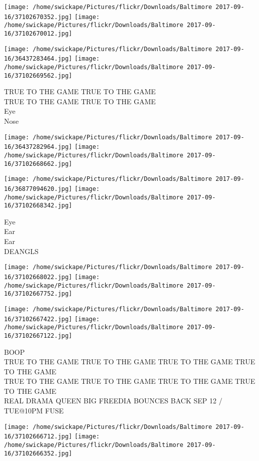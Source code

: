 \documentclass[10pt,letterpaper]{article}
\begin{document}
\texttt{[image: /home/swickape/Pictures/flickr/Downloads/Baltimore 2017-09-16/37102670352.jpg]}
\texttt{[image: /home/swickape/Pictures/flickr/Downloads/Baltimore 2017-09-16/37102670012.jpg]}

\texttt{[image: /home/swickape/Pictures/flickr/Downloads/Baltimore 2017-09-16/36437283464.jpg]}
\texttt{[image: /home/swickape/Pictures/flickr/Downloads/Baltimore 2017-09-16/37102669562.jpg]}

TRUE TO THE GAME TRUE TO THE GAME\\
TRUE TO THE GAME TRUE TO THE GAME\\
Eye\\
Nose
\pagebreak

\texttt{[image: /home/swickape/Pictures/flickr/Downloads/Baltimore 2017-09-16/36437282964.jpg]}
\texttt{[image: /home/swickape/Pictures/flickr/Downloads/Baltimore 2017-09-16/37102668662.jpg]}

\texttt{[image: /home/swickape/Pictures/flickr/Downloads/Baltimore 2017-09-16/36877094620.jpg]}
\texttt{[image: /home/swickape/Pictures/flickr/Downloads/Baltimore 2017-09-16/37102668342.jpg]}

Eye\\
Ear\\
Ear\\
DEANGLS
\pagebreak

\texttt{[image: /home/swickape/Pictures/flickr/Downloads/Baltimore 2017-09-16/37102668022.jpg]}
\texttt{[image: /home/swickape/Pictures/flickr/Downloads/Baltimore 2017-09-16/37102667752.jpg]}

\texttt{[image: /home/swickape/Pictures/flickr/Downloads/Baltimore 2017-09-16/37102667422.jpg]}
\texttt{[image: /home/swickape/Pictures/flickr/Downloads/Baltimore 2017-09-16/37102667122.jpg]}

BOOP\\
TRUE TO THE GAME TRUE TO THE GAME TRUE TO THE GAME TRUE TO THE GAME\\
TRUE TO THE GAME TRUE TO THE GAME TRUE TO THE GAME TRUE TO THE GAME\\
REAL DRAMA QUEEN BIG FREEDIA BOUNCES BACK SEP 12 / TUE@10PM FUSE
\pagebreak

\texttt{[image: /home/swickape/Pictures/flickr/Downloads/Baltimore 2017-09-16/37102666712.jpg]}
\texttt{[image: /home/swickape/Pictures/flickr/Downloads/Baltimore 2017-09-16/37102666352.jpg]}
\end{document}
